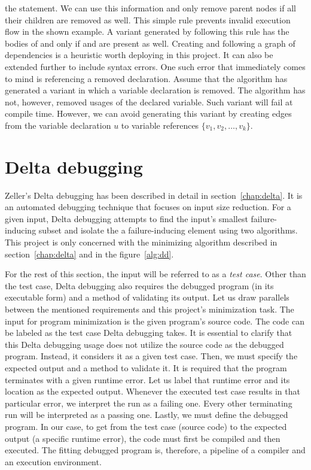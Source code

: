 the  statement. 
We can use this information and only remove parent nodes if all their 
children are removed as well. 
This simple rule prevents invalid execution flow in the shown example. 
A variant generated by following this rule has the bodies of  
and  only if  and  are 
present as well. 
Creating and following a graph of dependencies is a heuristic worth 
deploying in this project. 
It can also be extended further to include syntax errors. 
One such error that immediately comes to mind is referencing a removed 
declaration. 
Assume that the algorithm has generated a variant in which a variable 
declaration is removed. 
The algorithm has not, however, removed usages of the declared variable. 
Such variant will fail at compile time. 
However, we can avoid generating this variant by creating edges from 
the variable declaration $u$ to variable references
$\{v_1, v_2, \ldots, v_k\}$. 

\section{Delta debugging}\label{chap:deltaimplementation}

Zeller's Delta debugging \cite{Zeller99, Zeller02, Zeller01} has been 
described in detail in section~\ref{chap:delta}.
It is an automated debugging technique that focuses on input size reduction.
For a given input, Delta debugging attempts to find the input's 
smallest failure-inducing subset and isolate the a failure-inducing element 
using two algorithms.
This project is only concerned with the minimizing algorithm described in
section~\ref{chap:delta} and in the figure~\ref{alg:dd}.

For the rest of this section, the input will be referred to as 
a \emph{test case}.
Other than the test case, Delta debugging also requires the debugged program 
(in its executable form) and a method of validating its output.
Let us draw parallels between the mentioned requirements and this project's 
minimization task.
The input for program minimization is the given program's source code.
The code can be labeled as the test case Delta debugging takes.
It is essential to clarify that this Delta debugging usage does not utilize 
the source code as the debugged program.
Instead, it considers it as a given test case.
Then, we must specify the expected output and a method to validate it.
It is required that the program terminates with a given runtime error.
Let us label that runtime error and its location as the expected output.
Whenever the executed test case results in that particular error, we 
interpret the run as a failing one.
Every other terminating run will be interpreted as a passing one.
Lastly, we must define the debugged program.
In our case, to get from the test case (source code) to the expected 
output (a specific runtime error), the code must first be compiled 
and then executed.
The fitting debugged program is, therefore, a pipeline of a compiler and 
an execution environment.

